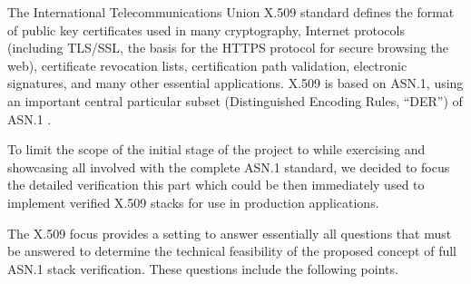 \documentclass[acmsmall,nonacm]{acmart}
\begin{document}
The International Telecommunications Union X.509 standard
\cite{TODO:16} defines the format of public key certificates used in
many cryptography, Internet protocols (including TLS/SSL, the basis
for the HTTPS protocol for secure browsing the web), certificate
revocation lists, certification path validation, electronic
signatures, and many other essential applications. X.509 is based on
ASN.1, using an important central particular subset (Distinguished
Encoding Rules, ``DER'') of ASN.1 \cite{TODO:37}.

To limit the scope of the initial stage of the project to while
exercising and showcasing all involved with the complete ASN.1
standard, we decided to focus the detailed verification this part
which could be then immediately used to implement verified X.509
stacks for use in production applications.
 
The X.509 focus provides a setting to answer essentially all questions
that must be answered to determine the technical feasibility of the
proposed concept of full ASN.1 stack verification. These questions
include the following points.
\end{document}

